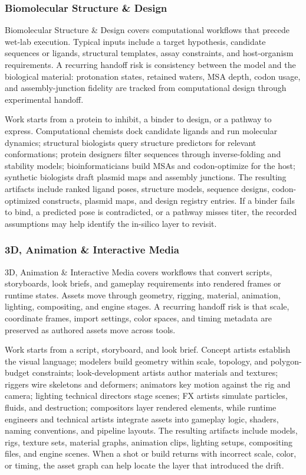 \subsubsection{Biomolecular Structure \& Design}
Biomolecular Structure \& Design covers computational workflows that precede wet-lab execution.
Typical inputs include a target hypothesis, candidate sequences or ligands, structural templates,
assay constraints, and host-organism requirements. A recurring handoff risk is consistency between the
model and the biological material: protonation states, retained waters, MSA depth, codon usage, and
assembly-junction fidelity are tracked from computational design through experimental handoff.

Work starts from a protein to inhibit, a binder to design, or a pathway to express. Computational
chemists dock candidate ligands and run molecular dynamics; structural biologists query structure
predictors for relevant conformations; protein designers filter sequences through inverse-folding
and stability models; bioinformaticians build MSAs and codon-optimize for the host; synthetic
biologists draft plasmid maps and assembly junctions. The resulting artifacts include ranked ligand
poses, structure models, sequence designs, codon-optimized constructs, plasmid maps, and design
registry entries. If a binder fails to bind, a predicted pose is contradicted, or a pathway misses
titer, the recorded assumptions may help identify the in-silico layer to revisit.

\subsubsection{3D, Animation \& Interactive Media}
3D, Animation \& Interactive Media covers workflows that convert scripts, storyboards, look briefs,
and gameplay requirements into rendered frames or runtime states. Assets move through geometry,
rigging, material, animation, lighting, compositing, and engine stages. A recurring handoff risk is
that scale, coordinate frames, import settings, color spaces, and timing metadata are preserved as
authored assets move across tools.

Work starts from a script, storyboard, and look brief. Concept artists establish the visual language;
modelers build geometry within scale, topology, and polygon-budget constraints; look-development
artists author materials and textures; riggers wire skeletons and deformers; animators key motion
against the rig and camera; lighting technical directors stage scenes; FX artists simulate particles,
fluids, and destruction; compositors layer rendered elements, while runtime engineers and technical
artists integrate assets into gameplay logic, shaders, naming conventions, and pipeline layouts. The
resulting artifacts include models, rigs, texture sets, material graphs, animation clips, lighting
setups, compositing files, and engine scenes. When a shot or build returns with incorrect scale,
color, or timing, the asset graph can help locate the layer that introduced the drift.


